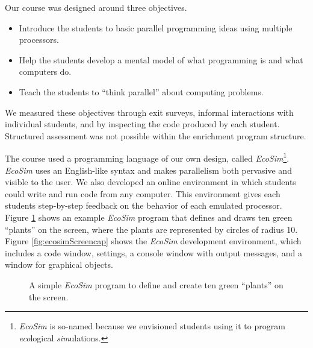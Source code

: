 \documentclass{sig-alternate}
\newcommand{\INDSTATE}[1][1]{\STATE\hspace{#1\algorithmicindent}}
\newcommand{\EcoSim}{\emph{EcoSim}}
\begin{document}
Our course was designed around three objectives.
\begin{itemize}
\item Introduce the students to basic parallel programming ideas using multiple processors.
\item Help the students develop a mental model of what programming is and what computers do.
\item Teach the students to ``think parallel'' about computing problems.
\end{itemize}
We measured these objectives through exit surveys, 
informal interactions with individual students, 
and by inspecting the code produced by each student.
Structured assessment was not possible within the enrichment program structure.

The course used a programming language of our own design, called \EcoSim{}\footnote{
\EcoSim{} is so-named because we envisioned students using it to program \emph{eco}logical \emph{sim}ulations.}.
\EcoSim{} uses an English-like syntax and makes parallelism both pervasive and visible to the user.
We also developed an online environment in which students could write and run code from any computer.
This environment gives each students step-by-step feedback on the behavior of each emulated processor.
Figure \ref{fig:exampleProgram} shows an example \emph{EcoSim} program that defines and
draws ten green ``plants'' on the screen, where the plants are represented by circles of radius 10.
Figure \ref{fig:ecosimScreencap} shows the \emph{EcoSim} development environment, which includes
a code window, settings, a console window with output messages, and a window for graphical objects.
\begin{figure}
\begin{algorithmic}[1]\sf
  \INDSTATE{a position}
  \INDSTATE{size, a number}
  \INDSTATE{a color}
\STATE{}
  \INDSTATE{do in order}
  \INDSTATE[2]{replace the plant's color with green}
  \INDSTATE[2]{replace the plant's size with 10}
\end{algorithmic} 
\caption{A simple \emph{EcoSim} program to define and create ten green ``plants'' on the screen.}
\label{fig:exampleProgram} 
\end{figure}
\end{document}
